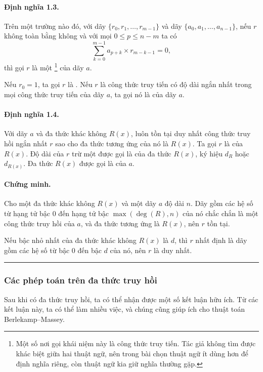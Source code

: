 \documentclass[11pt]{article}
\newcommand{\qedmark}{\hfill\rule{0.7ex}{0.7ex}}
\begin{document}
\paragraph{Định nghĩa 1.3.}
Trên một trường nào đó, với dãy \(\{r_0,r_1,\ldots,r_{m-1}\}\) và dãy
\(\{a_0,a_1,\ldots,a_{n-1}\}\), nếu \(r\) không toàn bằng không và với mọi
\(0\le p\le n-m\) ta có
\[
  \sum_{k=0}^{m-1}a_{p+k}\times r_{m-k-1}=0,
  \tag{1.1}
\]
thì gọi \(r\) là một \footnote{Một số nơi gọi khái
niệm này là công thức truy tiến. Tác giả không tìm được khác biệt giữa hai
thuật ngữ, nên trong bài chọn thuật ngữ ít dùng hơn để định nghĩa riêng, còn
thuật ngữ kia giữ nghĩa thường gặp.} của dãy \(a\).

Nếu \(r_0=1\), ta gọi \(r\) là . Nếu \(r\) là công
thức truy tiến có độ dài ngắn nhất trong mọi công thức truy tiến của dãy
\(a\), ta gọi nó là  của dãy \(a\).

\paragraph{Định nghĩa 1.4.}
Với dãy \(a\) và đa thức khác không \(R(x)\), luôn tồn tại duy nhất công thức
truy hồi ngắn nhất \(r\) sao cho đa thức tương ứng của nó là \(R(x)\). Ta gọi
\(r\) là  của \(R(x)\). Độ dài của
\(r\) trừ một được gọi là  của đa thức \(R(x)\), ký hiệu
\(d_R\) hoặc \(d_{R(x)}\). Đa thức \(R(x)\) được gọi là  của \(a\).

\paragraph{Chứng minh.}
Cho một đa thức khác không \(R(x)\) và một dãy \(a\) độ dài \(n\). Dãy gồm các
hệ số từ hạng tử bậc \(0\) đến hạng tử bậc \(\max(\deg(R),n)\) của nó chắc
chắn là một công thức truy hồi của \(a\), và đa thức tương ứng là \(R(x)\), nên
\(r\) tồn tại.

Nếu bậc nhỏ nhất của đa thức khác không \(R(x)\) là \(d\), thì \(r\) nhất định
là dãy gồm các hệ số từ bậc \(0\) đến bậc \(d\) của nó, nên \(r\) là duy nhất.
\qedmark

\subsubsection{Các phép toán trên đa thức truy hồi}

Sau khi có đa thức truy hồi, ta có thể nhận được một số kết luận hữu ích. Từ
các kết luận này, ta có thể làm nhiều việc, và chúng cũng giúp ích cho thuật
toán Berlekamp--Massey.
\end{document}
